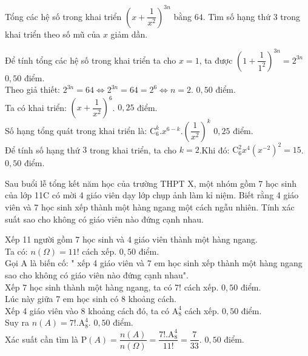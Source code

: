 \begin{bt}[2,0 điểm]%
Tổng các hệ số trong khai triển $\left(x+\dfrac{1}{x^2}\right)^{3n}$ bằng $64$. Tìm số hạng thứ $3$ trong khai triển theo số mũ của $x$ giảm dần.
	\loigiai
	{Để tính tổng các hệ số trong khai triển ta cho $x=1$, ta được $\left(1+\dfrac{1}{1^2}\right)^{3n} = 2^{3n}$  \dotfill $0,50$ điểm.\\
		Theo giả thiết:	$2^{3n}=64 \Leftrightarrow 2^{3n}=64=2^6 \Leftrightarrow n=2$. \dotfill $0,50$ điểm.\\
		Ta có khai triển: $\left(x+\dfrac{1}{x^2}\right)^6$. \dotfill $0,25$ điểm.\\
		Số hạng tổng quát trong khai triển là: $\mathrm{C}^k_6.x^{6-k}. {\left( \dfrac{1}{x^2} \right)}^k$ \dotfill $0,25$ điểm.\\
		Để tính  số hạng thứ $3$ trong khai triển, ta cho $k=2$.Khi đó: $\mathrm{C}_6^2x^4\left(x^{-2}\right)^2=15$. \dotfill $0,50$ điểm.
		
	}
\end{bt} 

\begin{bt}[2,5 điểm]%
Sau buổi lễ tổng kết năm học của trường THPT X, một nhóm gồm 7 học sinh của  lớp 11C có mời 4 giáo viên dạy lớp chụp ảnh làm kỉ niệm.  Biết rằng 4 giáo viên và 7 học sinh xếp thành một hàng ngang một cách ngẫu nhiên. Tính xác suất sao cho không có giáo viên nào đứng cạnh nhau. 
	\loigiai
	{	Xếp 11 người gồm 7 học sinh và 4 giáo viên thành một hàng ngang.\\
		Ta có: $n(\Omega )=11!$ cách xếp. \dotfill $0,50$ điểm.\\
		Gọi A là biến cố: " xếp 4 giáo viên và 7 em học sinh xếp thành một hàng ngang sao cho không có giáo viên nào đứng cạnh nhau".\\
		Xếp 7 học sinh thành một hàng ngang, ta có 7! cách xếp. \dotfill $0,50$ điểm.\\
		Lúc này giữa 7 em học sinh có 8 khoảng cách.\\
		Xếp 4 giáo viên vào 8 khoảng cách đó, ta có $\mathrm{A}_{8}^{4}$ cách xếp. \dotfill $0,50$ điểm. \\
		Suy ra $n(A)=7!.\mathrm{A}_{8}^{4}$. \dotfill $0,50$ điểm. \\
		Xác suất cần tìm là $\mathrm{P}(A)=\dfrac{n(A)}{n(\Omega )}=\dfrac{7!.\mathrm{A}_{8}^{4}}{11!}=\dfrac{7}{33}$. \dotfill $0,50$ điểm.
		
	}
\end{bt}

